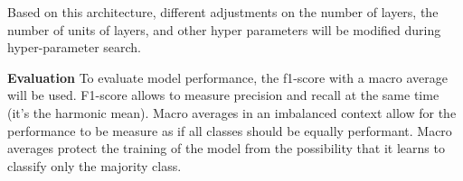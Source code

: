Based on this architecture, different adjustments on the number of layers, the number of units of layers, and other hyper parameters will be modified during hyper-parameter search.



\textbf{Evaluation}
To evaluate model performance, the f1-score with a macro average will be used. F1-score allows to measure precision and recall at the same time (it's the harmonic mean). Macro averages in an imbalanced context allow for the performance to be measure as if all classes should be equally performant. Macro averages protect the training of the model from the possibility that it learns to classify only the majority class.